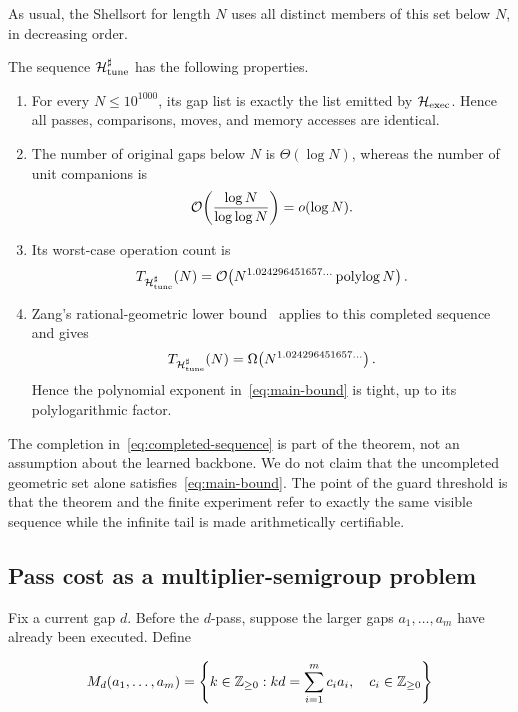 As usual, the Shellsort for length $N$ uses all distinct members of this set
below $N$, in decreasing order.

\begin{theorem}
  \label{thm:main}
  The sequence $\mathcal H^\sharp_{\rm tune}$ has the following properties.
  \begin{enumerate}
    \item For every $N\le10^{1000}$, its gap list is exactly the list emitted
    by $\mathcal H_{\rm exec}$.  Hence all passes, comparisons, moves, and
    memory accesses are identical.
    \item The number of original gaps below $N$ is $\Theta(\log N)$, whereas
    the number of unit companions is
    \[
      \mathcal{O}\!\left(\frac{\log N}{\log\log N}\right)=o(\log N).
    \]
    \item Its worst-case operation count is
    \begin{equation}
      T_{\mathcal H^\sharp_{\rm tune}}(N)
      =\mathcal{O}\!\left(
        N^{1.024296451657\ldots}\operatorname{polylog} N
      \right).
      \label{eq:main-bound}
    \end{equation}
    \item Zang's rational-geometric lower bound~\cite[Theorem~3]{zang2026}
    applies to this completed sequence and gives
    \[
      T_{\mathcal H^\sharp_{\rm tune}}(N)
      =\Omega\!\left(N^{1.024296451657\ldots}\right).
    \]
    Hence the polynomial exponent in~\eqref{eq:main-bound} is tight, up to its
    polylogarithmic factor.
  \end{enumerate}
\end{theorem}

The completion in~\cref{eq:completed-sequence} is part of the theorem, not an
assumption about the learned backbone.  We do not claim that the uncompleted
geometric set alone satisfies~\eqref{eq:main-bound}.  The point of the guard
threshold is that the theorem and the finite experiment refer to exactly the
same visible sequence while the infinite tail is made arithmetically
certifiable.

\subsection{Pass cost as a multiplier-semigroup problem}

Fix a current gap $d$.  Before the $d$-pass, suppose the larger gaps
$a_1,\ldots,a_m$ have already been executed.  Define

\[
  M_d(a_1,\ldots,a_m)
  =\left\{k\in\mathbb{Z}_{\ge0}:
    kd=\sum_{i=1}^m c_i a_i,\quad c_i\in\mathbb{Z}_{\ge0}
  \right\}
\]

